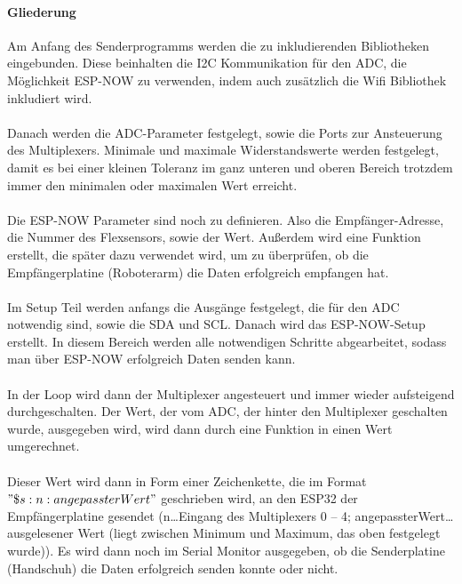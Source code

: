 \documentclass[titlepage,12pt,twoside]{article}
\begin{document}
\paragraph{Gliederung}
\hfill \break
\hfill \break
Am Anfang des Senderprogramms werden die zu inkludierenden Bibliotheken eingebunden. Diese beinhalten die I2C Kommunikation für 
den ADC, die Möglichkeit ESP-NOW zu verwenden, indem auch zusätzlich die Wifi Bibliothek inkludiert wird. \\
\\
Danach werden die ADC-Parameter festgelegt, sowie die Ports zur Ansteuerung des Multiplexers. Minimale und maximale 
Widerstandswerte werden festgelegt, damit es bei einer kleinen Toleranz im ganz unteren und oberen Bereich trotzdem immer den 
minimalen oder maximalen Wert erreicht. \\
\\
Die ESP-NOW Parameter sind noch zu definieren. Also die Empfänger-Adresse, die Nummer des Flexsensors, sowie der Wert. Außerdem 
wird eine Funktion erstellt, die später dazu verwendet wird, um zu überprüfen, ob die Empfängerplatine (Roboterarm) die Daten 
erfolgreich empfangen hat. \\
\\
Im Setup Teil werden anfangs die Ausgänge festgelegt, die für den ADC notwendig sind, sowie die SDA und SCL. Danach wird das 
ESP-NOW-Setup erstellt. In diesem Bereich werden alle notwendigen Schritte abgearbeitet, sodass man über ESP-NOW erfolgreich 
Daten senden kann. \\
\\
In der Loop wird dann der Multiplexer angesteuert und immer wieder aufsteigend durchgeschalten. Der Wert, der vom ADC, der
hinter den Multiplexer geschalten wurde, ausgegeben wird, wird dann durch eine Funktion in einen Wert umgerechnet. \\
\\
Dieser Wert wird dann in Form einer Zeichenkette, die im Format $"\$s:n:angepassterWert"$ geschrieben wird, an den ESP32 der 
Empfängerplatine gesendet (n…Eingang des Multiplexers 0 – 4; angepassterWert…ausgelesener Wert (liegt zwischen Minimum und 
Maximum, das oben festgelegt wurde)). Es wird dann noch im Serial Monitor ausgegeben, ob die Senderplatine (Handschuh) die 
Daten erfolgreich senden konnte oder nicht. \\
\\
\end{document}
